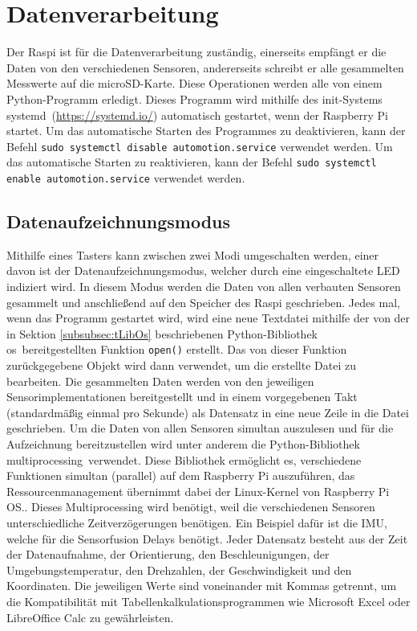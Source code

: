 \section{Datenverarbeitung}
\label{sec:Datenverarbeitung}
Der \ac{Raspi} ist für die Datenverarbeitung zuständig, einerseits empfängt er die Daten von den verschiedenen Sensoren, andererseits schreibt er alle gesammelten Messwerte auf die microSD-Karte. Diese Operationen werden alle von einem Python-Programm erledigt. Dieses Programm wird mithilfe des init-Systems \glqq systemd\grqq\ (\url{https://systemd.io/}) automatisch gestartet, wenn der Raspberry Pi startet. Um das automatische Starten des Programmes zu deaktivieren, kann der Befehl \verb|sudo systemctl disable automotion.service| verwendet werden. Um das automatische Starten zu reaktivieren, kann der Befehl \verb|sudo systemctl enable automotion.service| verwendet werden.
\subsection{Datenaufzeichnungsmodus}
\label{subsec:Datenaufzeichnungsmodus}
Mithilfe eines Tasters kann zwischen zwei Modi umgeschalten werden, einer davon ist der Datenaufzeichnungsmodus, welcher durch eine eingeschaltete \ac{LED} indiziert wird. In diesem Modus werden die Daten von allen verbauten Sensoren gesammelt und anschließend auf den Speicher des \ac{Raspi} geschrieben. Jedes mal, wenn das Programm gestartet wird, wird eine neue Textdatei mithilfe der von der in Sektion \ref{subsubsec:tLibOs} beschriebenen Python-Bibliothek \glqq os\grqq\ bereitgestellten Funktion \verb|open()| erstellt. Das von dieser Funktion zurückgegebene Objekt wird dann verwendet, um die erstellte Datei zu bearbeiten. Die gesammelten Daten werden von den jeweiligen Sensorimplementationen bereitgestellt und in einem vorgegebenen Takt (standardmäßig einmal pro Sekunde) als Datensatz in eine neue Zeile in die Datei geschrieben. Um die Daten von allen Sensoren simultan auszulesen und für die Aufzeichnung bereitzustellen wird unter anderem die Python-Bibliothek \glqq multiprocessing\grqq\ verwendet. Diese Bibliothek ermöglicht es, verschiedene Funktionen simultan (parallel) auf dem Raspberry Pi auszuführen, das Ressourcenmanagement übernimmt dabei der Linux-Kernel von Raspberry Pi OS.. Dieses Multiprocessing wird benötigt, weil die verschiedenen Sensoren unterschiedliche Zeitverzögerungen benötigen. Ein Beispiel dafür ist die \ac{IMU}, welche für die Sensorfusion Delays benötigt. Jeder Datensatz besteht aus der Zeit der Datenaufnahme, der Orientierung, den Beschleunigungen, der Umgebungstemperatur, den Drehzahlen, der Geschwindigkeit und den Koordinaten. Die jeweiligen Werte sind voneinander mit Kommas getrennt, um die Kompatibilität mit Tabellenkalkulationsprogrammen wie Microsoft Excel oder LibreOffice Calc zu gewährleisten.
